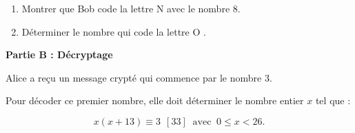 \documentclass[10pt,a4paper]{article}
\begin{document}
\medskip
\begin{enumerate}
\item Montrer que Bob code la lettre \og N \fg{} avec le nombre 8.
\item Déterminer le nombre qui code la lettre \og O \fg.
\end{enumerate}

\bigskip

\textbf{Partie B : Décryptage}

\medskip

Alice a reçu un message crypté qui commence par le nombre 3.

Pour décoder ce premier nombre, elle doit déterminer le nombre entier $x$ tel que :

\[x(x + 13) \equiv  3 \:\: [33]\:  \text{ avec }\: 0 \leqslant  x < 26.\]

\medskip
\end{document}
